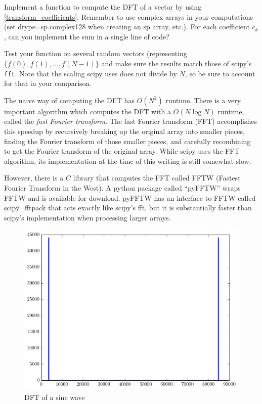\begin{problem} %
Implement a function to compute the DFT of a vector by using \eqref{transform_coefficients}.
Remember to use complex arrays in your computations (set dtype=sp.complex128 when creating an sp array, etc.).
For each coefficient $c_k$, can you implement the sum in a single line of code?

Test your function on several random vectors (representing $\lbrace f(0),f(1),\dots,f(N-1)\rbrace$ and make sure the results match those of scipy's \texttt{fft}. 
Note that the scaling scipy uses does not divide by $N$, so be sure to account for that in your comparison.
\end{problem}

The naive way of computing the DFT has $O(N^2)$ runtime.
There is a very important algorithm which computes the DFT with a $O(N \log N)$ runtime, called the \emph{fast Fourier transform}.
The fast Fourier transform (FFT) accomplishes this speedup by recursively breaking up the original array into smaller pieces, finding the Fourier transform of those smaller pieces, and carefully recombining to get the Fourier transform of the original array.
While scipy uses the FFT algorithm, its implementation at the time of this writing is still somewhat slow.

However, there is a $C$ library that computes the FFT called FFTW (Fastest Fourier Transform in the West).
A python package called ``pyFFTW'' wraps FFTW and is available for download. %
pyFFTW  has an interface to FFTW called scipy\_fftpack that acts exactly like scipy's fft, but it is substantially faster than scipy's implementation when processing larger arrays.

\begin{figure}[ht]\caption{DFT of a sine wave}\label{sinespec}\centering\includegraphics[width=\textwidth]{sinespec}\end{figure}

